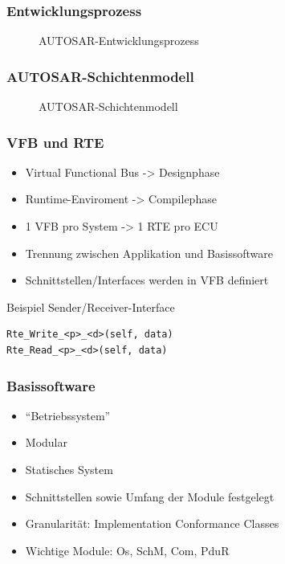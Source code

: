 \documentclass[]{beamer}
\newcommand{\inputImage}[1]{}
\begin{document}
\begin{frame}
\frametitle{Entwicklungsprozess}
    \begin{figure}[ht]
        \centering
        \resizebox{\linewidth}{!}{\inputImage{Autosar_Prozess.dia}}
        \caption{AUTOSAR-Entwicklungsprozess}
        \label{fig:autosar_prozess}
    \end{figure}
\end{frame}

\begin{frame}
\frametitle{AUTOSAR-Schichtenmodell}
    \begin{figure}[ht]
        \centering
        \resizebox{\linewidth}{!}{\inputImage{autosar_layer.dia}}
        \caption{AUTOSAR-Schichtenmodell}
        \label{fig:autosar_layer}
    \end{figure}
\end{frame}

\begin{frame}[fragile] %
\frametitle{VFB und RTE}
    \begin{itemize}
        \item Virtual Functional Bus -> Designphase
        \item Runtime-Enviroment -> Compilephase
        \item 1 VFB pro System -> 1 RTE pro ECU
        \item Trennung zwischen Applikation und Basissoftware
        \item Schnittstellen/Interfaces werden in VFB definiert
    \end{itemize}
    \begin{exampleblock}{Beispiel Sender/Receiver-Interface}
        \begin{verbatim}
Rte_Write_<p>_<d>(self, data)
Rte_Read_<p>_<d>(self, data)
        \end{verbatim}
    \end{exampleblock}
\end{frame}


\begin{frame}
\frametitle{Basissoftware}
    \begin{itemize}
        \item "`Betriebssystem"'
        \item Modular
        \item Statisches System
        \item Schnittstellen sowie Umfang der Module festgelegt
        \item Granularität: Implementation Conformance Classes
        \item Wichtige Module: Os, SchM, Com, PduR
    \end{itemize}
\end{frame}
\end{document}

